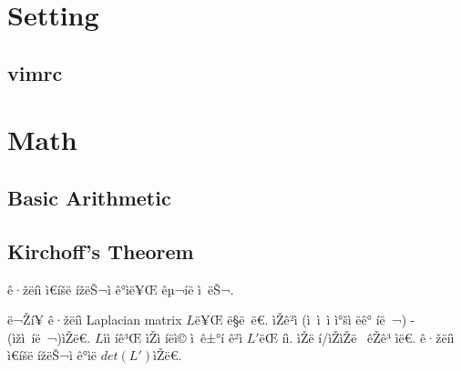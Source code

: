 \documentclass[10pt,landscape,a4paper,twocolumn]{article}
\begin{document}
\tableofcontents


\section{Setting}

\subsection{vimrc}
%


\section{Math}

\subsection{Basic Arithmetic}


%

%

%

%
\subsection{Kirchoff's Theorem}

ê·žëíì ì€íšë ížëŠ¬ì ê°ìë¥Œ êµ¬íë ì ëŠ¬.

ë¬Ží¥ ê·žëíì Laplacian matrix $L$ë¥Œ ë§ë ë€. ìŽê²ì (ì ì ì ì°šì ëê° íë ¬) - (ìžì íë ¬)ìŽë€.
$L$ìì íê³Œ ìŽì íëì© ì ê±°í ê²ì $L'$ëŒ íì. ìŽë í/ìŽìŽë  êŽê³ ìë€.
ê·žëíì ì€íšë ížëŠ¬ì ê°ìë $det(L')$ìŽë€.
\end{document}
